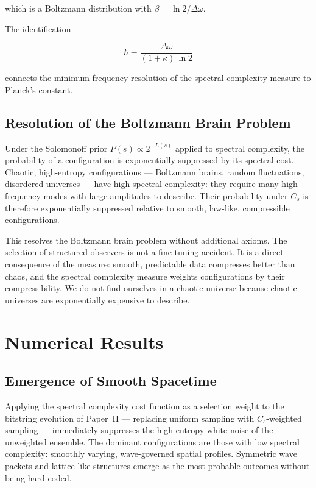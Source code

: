 \documentclass[11pt]{article}
\begin{document}
which is a Boltzmann distribution with $\beta = \ln 2 / \Delta\omega$.

The identification

\[
\hbar = \frac{\Delta\omega}{(1+\kappa)\,\ln 2}
\]

connects the minimum frequency resolution of the spectral complexity
measure to Planck's constant. 

\subsection{Resolution of the Boltzmann Brain Problem}

Under the Solomonoff prior $P(s) \propto 2^{-L(s)}$ applied to spectral
complexity, the probability of a configuration is exponentially
suppressed by its spectral cost. Chaotic, high-entropy configurations ---
Boltzmann brains, random fluctuations, disordered universes --- have high
spectral complexity: they require many high-frequency modes with large
amplitudes to describe. Their probability under $C_s$ is therefore
exponentially suppressed relative to smooth, law-like, compressible
configurations.

This resolves the Boltzmann brain problem without additional axioms. The
selection of structured observers is not a fine-tuning accident. It is a
direct consequence of the measure: smooth, predictable data compresses
better than chaos, and the spectral complexity measure weights
configurations by their compressibility. We do not find ourselves in a
chaotic universe because chaotic universes are exponentially expensive to
describe.

\section{Numerical Results}
\label{sec:simulations}

\subsection{Emergence of Smooth Spacetime}

Applying the spectral complexity cost function as a selection weight to
the bitstring evolution of Paper~II --- replacing uniform sampling with
$C_s$-weighted sampling --- immediately suppresses the high-entropy white
noise of the unweighted ensemble. The dominant configurations are those
with low spectral complexity: smoothly varying, wave-governed spatial
profiles. Symmetric wave packets and lattice-like structures emerge as the
most probable outcomes without being hard-coded.
\end{document}
